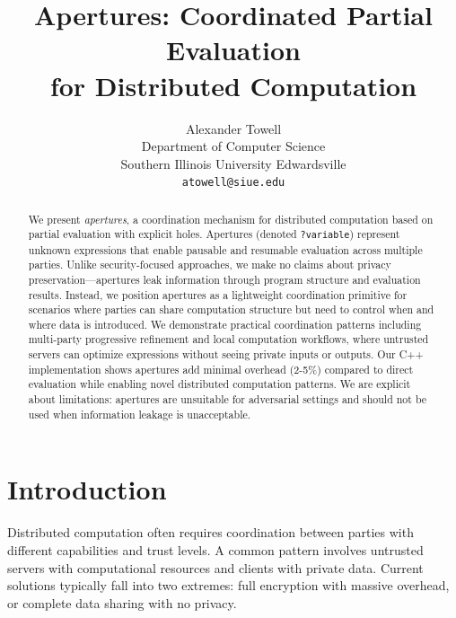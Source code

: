 \documentclass[10pt]{article}
\begin{document}
\title{Apertures: Coordinated Partial Evaluation\\for Distributed Computation}

\author{
Alexander Towell\\
Department of Computer Science\\
Southern Illinois University Edwardsville\\
\texttt{atowell@siue.edu}
}

\date{}

\maketitle

\begin{abstract}
We present \textit{apertures}, a coordination mechanism for distributed computation based on partial evaluation with explicit holes. Apertures (denoted \texttt{?variable}) represent unknown expressions that enable pausable and resumable evaluation across multiple parties. Unlike security-focused approaches, we make no claims about privacy preservation—apertures leak information through program structure and evaluation results. Instead, we position apertures as a lightweight coordination primitive for scenarios where parties can share computation structure but need to control when and where data is introduced. We demonstrate practical coordination patterns including multi-party progressive refinement and local computation workflows, where untrusted servers can optimize expressions without seeing private inputs or outputs. Our C++ implementation shows apertures add minimal overhead (2-5\%) compared to direct evaluation while enabling novel distributed computation patterns. We are explicit about limitations: apertures are unsuitable for adversarial settings and should not be used when information leakage is unacceptable.
\end{abstract}

\section{Introduction}

Distributed computation often requires coordination between parties with different capabilities and trust levels. A common pattern involves untrusted servers with computational resources and clients with private data. Current solutions typically fall into two extremes: full encryption with massive overhead, or complete data sharing with no privacy.
\end{document}
